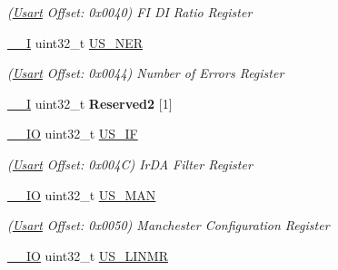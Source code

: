 \begin{DoxyCompactItemize}
\begin{DoxyCompactList}\small\item\em (\mbox{\hyperlink{structUsart}{Usart}} Offset\+: 0x0040) FI DI Ratio Register \end{DoxyCompactList}\item 
\mbox{\label{structUsart_afc0736a842a861c4eaba268418b3bfc8}} 
\mbox{\hyperlink{core__cm7_8h_af63697ed9952cc71e1225efe205f6cd3}{\+\_\+\+\_\+I}} uint32\+\_\+t \mbox{\hyperlink{structUsart_afc0736a842a861c4eaba268418b3bfc8}{U\+S\+\_\+\+N\+ER}}
\begin{DoxyCompactList}\small\item\em (\mbox{\hyperlink{structUsart}{Usart}} Offset\+: 0x0044) Number of Errors Register \end{DoxyCompactList}\item 
\mbox{\label{structUsart_ae7eca14ffdc15372aa1ef92e5412a3ae}} 
\mbox{\hyperlink{core__cm7_8h_af63697ed9952cc71e1225efe205f6cd3}{\+\_\+\+\_\+I}} uint32\+\_\+t {\bfseries Reserved2} \mbox{[}1\mbox{]}
\item 
\mbox{\label{structUsart_a334950675ab1781120e58481d20d7581}} 
\mbox{\hyperlink{core__cm7_8h_aec43007d9998a0a0e01faede4133d6be}{\+\_\+\+\_\+\+IO}} uint32\+\_\+t \mbox{\hyperlink{structUsart_a334950675ab1781120e58481d20d7581}{U\+S\+\_\+\+IF}}
\begin{DoxyCompactList}\small\item\em (\mbox{\hyperlink{structUsart}{Usart}} Offset\+: 0x004C) Ir\+DA Filter Register \end{DoxyCompactList}\item 
\mbox{\label{structUsart_a01ffa7ba9dfda7859242682198eccac8}} 
\mbox{\hyperlink{core__cm7_8h_aec43007d9998a0a0e01faede4133d6be}{\+\_\+\+\_\+\+IO}} uint32\+\_\+t \mbox{\hyperlink{structUsart_a01ffa7ba9dfda7859242682198eccac8}{U\+S\+\_\+\+M\+AN}}
\begin{DoxyCompactList}\small\item\em (\mbox{\hyperlink{structUsart}{Usart}} Offset\+: 0x0050) Manchester Configuration Register \end{DoxyCompactList}\item 
\mbox{\label{structUsart_aecbab0892d8e515361721920f5f2d2f9}} 
\mbox{\hyperlink{core__cm7_8h_aec43007d9998a0a0e01faede4133d6be}{\+\_\+\+\_\+\+IO}} uint32\+\_\+t \mbox{\hyperlink{structUsart_aecbab0892d8e515361721920f5f2d2f9}{U\+S\+\_\+\+L\+I\+N\+MR}}

\end{DoxyCompactItemize}
